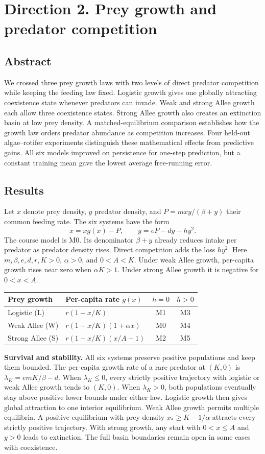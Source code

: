 \section*{Direction 2. Prey growth and predator competition}
\subsection*{Abstract}
We crossed three prey growth laws with two levels of direct predator competition while keeping the feeding law fixed. Logistic growth gives one globally attracting coexistence state whenever predators can invade. Weak and strong Allee growth each allow three coexistence states. Strong Allee growth also creates an extinction basin at low prey density. A matched-equilibrium comparison establishes how the growth law orders predator abundance as competition increases. Four held-out algae--rotifer experiments distinguish these mathematical effects from predictive gains. All six models improved on persistence for one-step prediction, but a constant training mean gave the lowest average free-running error.

\subsection*{Results}
Let $x$ denote prey density, $y$ predator density, and $P=mxy/(\beta+y)$ their common feeding rate. The six systems have the form
\[
 \dot x=xg(x)-P,\qquad \dot y=eP-dy-hy^2.
\]
The course model is M0. Its denominator $\beta+y$ already reduces intake per predator as predator density rises. Direct competition adds the loss $hy^2$. Here $m,\beta,e,d,r,K>0$, $\alpha>0$, and $0<A<K$. Under weak Allee growth, per-capita growth rises near zero when $\alpha K>1$. Under strong Allee growth it is negative for $0<x<A$.

\begin{center}
\begin{tabular}{@{}llcc@{}}\toprule
Prey growth & Per-capita rate $g(x)$ & $h=0$ & $h>0$\\\midrule
Logistic (L) & $r(1-x/K)$ & M1 & M3\\
Weak Allee (W) & $r(1-x/K)(1+\alpha x)$ & M0 & M4\\
Strong Allee (S) & $r(1-x/K)(x/A-1)$ & M2 & M5\\\bottomrule
\end{tabular}
\end{center}

\textbf{Survival and stability.} All six systems preserve positive populations and keep them bounded. The per-capita growth rate of a rare predator at $(K,0)$ is $\lambda_K=emK/\beta-d$. When $\lambda_K\leq0$, every strictly positive trajectory with logistic or weak Allee growth tends to $(K,0)$. When $\lambda_K>0$, both populations eventually stay above positive lower bounds under either law. Logistic growth then gives global attraction to one interior equilibrium. Weak Allee growth permits multiple equilibria. A positive equilibrium with prey density $x_*\ge K-1/\alpha$ attracts every strictly positive trajectory. With strong growth, any start with $0<x\leq A$ and $y>0$ leads to extinction. The full basin boundaries remain open in some cases with coexistence.

